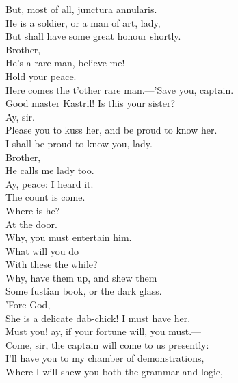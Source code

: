 \documentclass[a4paper,oneside]{memoir}
\begin{document}
\begin{drama*}
But, most of all, junctura annularis.\\
He is a soldier, or a man of art, lady,\\
But shall have some great honour shortly.\\
\pliantspeaks Brother,\\
He's a rare man, believe me!\\
\kastrilspeaks {} Hold your peace.\\
Here comes the t'other rare man.---'Save you, captain.\\
\facespeaks Good master Kastril! Is this your sister?\\
\kastrilspeaks Ay, sir.\\
Please you to kuss her, and be proud to know her.\\
\facespeaks I shall be proud to know you, lady.\\
\pliantspeaks {} Brother,\\
He calls me lady too.\\
\kastrilspeaks {} Ay, peace: I heard it.\\
\facespeaks The count is come.\\
\subtlespeaks {} Where is he?\\
\facespeaks {} At the door.\\
\subtlespeaks Why, you must entertain him.\\
\facespeaks {} What will you do\\
With these the while?\\
\subtlespeaks {} Why, have them up, and shew them\\
Some fustian book, or the dark glass.\\
\facespeaks {} 'Fore God,\\
She is a delicate dab-chick! I must have her.\\
\subtlespeaks Must you! ay, if your fortune will, you must.---\\
Come, sir, the captain will come to us presently:\\
I'll have you to my chamber of demonstrations,\\
Where I will shew you both the grammar and logic,\\

\end{drama*}
\end{document}
